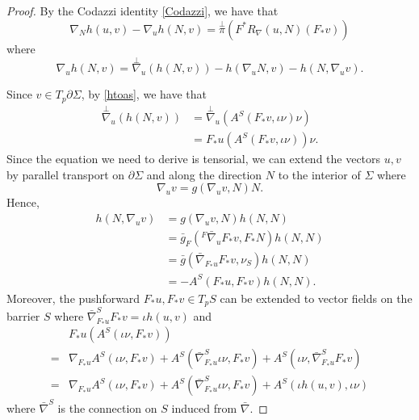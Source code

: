 \begin{proof}
    By the Codazzi identity \autoref{Codazzi}, we have that 
    \[\nabla _N h(u,v)-\nabla _u h(N,v)=\overset{\perp }{\pi} (F^*R_{\nabla }(u,N)(F_* v))\]
    where 
    \[\nabla _u h(N,v)=\overset{\perp }{\nabla} _u(h(N,v))-h(\nabla_u N, v)-h(N, \nabla _u v).\]

    Since $v \in T_p \partial \Sigma $, by \autoref{htoas}, we have that
    \begin{equation*}
    \begin{split}
        \overset{\perp }{\nabla} _u(h(N,v)) 
    &=  \overset{\perp }{\nabla} _u(A^S(F_{*}v, \iota \nu ) \nu)\\
    &= F_*u(A^S(F_{*}v, \iota \nu )) \nu.
    \end{split}
    \end{equation*} 
    Since the equation we need to derive is tensorial, we can extend the vectors $u,v$ by parallel transport on $\partial \Sigma $ and along the direction $N$ to the interior of $\Sigma $ where 
    \[\nabla _u v=g(\nabla _u v,N) N.\]
    Hence,
    \begin{equation*}
    \begin{split}
        h(N, \nabla _u v) 
    &= g(\nabla _u v,N) h(N,N)  \\
    &= \bar{g}_F({}^F \bar{\nabla } _u F_* v , F_*N) h(N,N)  \\
    &= \bar{g}(\bar{\nabla } _{F_*u} F_* v , \nu_S)h(N,N)  \\
    &= -A^S(F_*u, F_* v)h(N,N).
    \end{split}
    \end{equation*}
    Moreover, the pushforward $F_*u, F_* v \in T_pS$ can be extended to vector fields on the barrier $S$ where $\bar{\nabla }^{S}_{F_*u} F_*v=\iota h(u,v)$ and
    \begin{equation*}
    \begin{split}
        &F_*u(A^S(\iota \nu , F_*v)) \\
    =& \nabla _{F_*u}A^S(\iota \nu , F_*v)+A^S(\bar{\nabla }^{S}_{F_*u} \iota \nu , F_*v)+A^S(\iota \nu , \bar{\nabla }^{S}_{F_*u} F_*v)\\
    =& \nabla _{F_*u}A^S(\iota \nu , F_*v)+A^S(\bar{\nabla }^{S}_{F_*u} \iota \nu , F_*v)+A^S(\iota  h(u,v) , \iota \nu )
    \end{split}
    \end{equation*}
    where $\bar{\nabla }^{S}$ is the connection on $S$ induced from $\bar{\nabla }$.


\end{proof}
